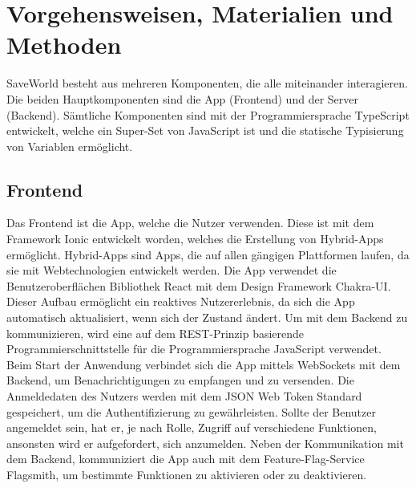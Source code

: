 \documentclass[../main.tex]{subfiles}
\begin{document}
    \chapter{Vorgehensweisen, Materialien und Methoden}
    SaveWorld besteht aus mehreren Komponenten, die alle miteinander interagieren.
    Die beiden Hauptkomponenten sind die App (Frontend) und der Server (Backend).
    Sämtliche Komponenten sind mit der Programmiersprache TypeScript entwickelt, welche ein Super-Set von JavaScript ist
    und die statische Typisierung von Variablen ermöglicht.


    \section{Frontend}
    Das Frontend ist die App, welche die Nutzer verwenden.
    Diese ist mit dem Framework Ionic entwickelt worden, welches die Erstellung von Hybrid-Apps ermöglicht.
    Hybrid-Apps sind Apps, die auf allen gängigen Plattformen laufen, da sie mit Webtechnologien entwickelt werden.
    Die App verwendet die Benutzeroberflächen Bibliothek React mit dem Design Framework Chakra-UI.
    Dieser Aufbau ermöglicht ein reaktives Nutzererlebnis, da sich die App automatisch aktualisiert, wenn sich der Zustand ändert.
    Um mit dem Backend zu kommunizieren, wird eine auf dem REST-Prinzip basierende Programmierschnittstelle f\"ur die Programmiersprache JavaScript verwendet.
    Beim Start der Anwendung verbindet sich die App mittels WebSockets mit dem Backend, um Benachrichtigungen zu empfangen und zu versenden.
    Die Anmeldedaten des Nutzers werden mit dem JSON Web Token Standard gespeichert, um die Authentifizierung zu gewährleisten.
    Sollte der Benutzer angemeldet sein, hat er, je nach Rolle, Zugriff auf verschiedene Funktionen, ansonsten wird er aufgefordert, sich anzumelden.
    Neben der Kommunikation mit dem Backend, kommuniziert die App auch mit dem Feature-Flag-Service Flagsmith, um bestimmte Funktionen zu aktivieren oder zu deaktivieren.
\end{document}
